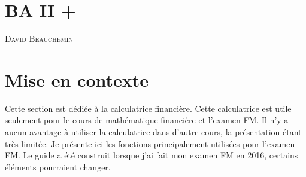 \documentclass[french]{article}
\makeatletter
\newcommand{\chapterauthor}[1]{%
  {\parindent0pt\vspace*{-15pt}%
  \linespread{1.1}\large\scshape#1%
  \par\nobreak\vspace*{35pt}}
  \@afterheading%
}
\makeatother
\begin{document}



\newpage
\section*{BA II +}
\chapterauthor{David Beauchemin}

\section*{Mise en contexte}
Cette section est dédiée à la calculatrice financière. Cette calculatrice est utile seulement pour le cours de mathématique financière et l'examen FM. Il n'y a aucun avantage à utiliser la calculatrice dans d'autre cours, la présentation étant très limitée. Je présente ici les fonctions principalement utilisées pour l'examen FM. Le guide a été construit lorsque j'ai fait mon examen FM en 2016, certains éléments pourraient changer.

\end{document}
